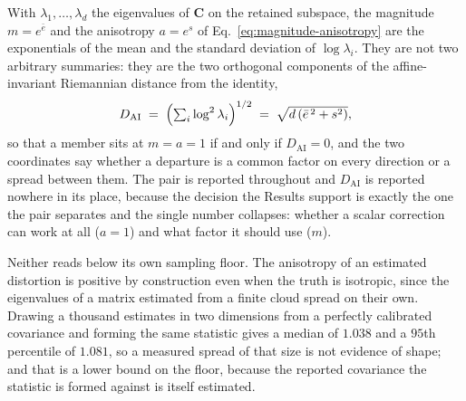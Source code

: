 \begin{appendixbox}
With $\lambda_1,\dots,\lambda_d$ the eigenvalues of $\mathbf{C}$ on the retained subspace, the
magnitude $m=e^{\bar e}$ and the anisotropy $a=e^{s}$ of Eq.~\ref{eq:magnitude-anisotropy} are the
exponentials of the mean and the standard deviation of $\log\lambda_i$. They are not two arbitrary
summaries: they are the two orthogonal components of the affine-invariant Riemannian distance from
the identity,
\begin{equation}
  D_{\mathrm{AI}} \;=\; \Bigl(\textstyle\sum_i \log^2\lambda_i\Bigr)^{1/2}
   \;=\; \sqrt{d\,(\bar e^{\,2}+s^2)},
  \label{eq:dai}
\end{equation}
so that a member sits at $m=a=1$ if and only if $D_{\mathrm{AI}}=0$, and the two coordinates say
whether a departure is a common factor on every direction or a spread between them. The pair is
reported throughout and $D_{\mathrm{AI}}$ is reported nowhere in its place, because the decision the
Results support is exactly the one the pair separates and the single number collapses: whether a
scalar correction can work at all ($a=1$) and what factor it should use ($m$).

Neither reads below its own sampling floor. The anisotropy of an estimated distortion is positive by
construction even when the truth is isotropic, since the eigenvalues of a matrix estimated from a
finite cloud spread on their own. Drawing a thousand estimates in two dimensions from a perfectly
calibrated covariance and forming the same statistic gives a median of $1.038$ and a $95$th
percentile of $1.081$, so a measured spread of that size is not evidence of shape; and that is a
lower bound on the floor, because the reported covariance the statistic is formed against is itself
estimated.

\end{appendixbox}
